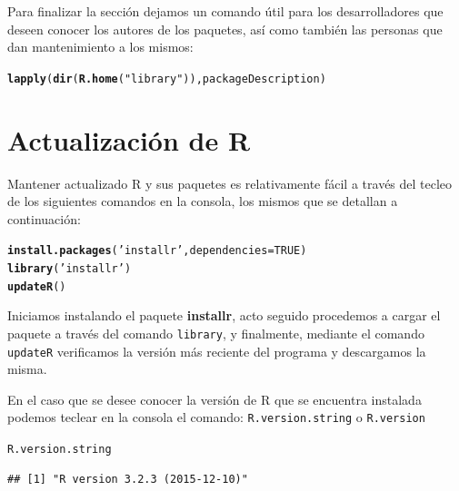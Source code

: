 \documentclass[11pt,a4paper,oneside]{book}\usepackage[]{graphicx}\usepackage[]{color}
\makeatletter
\newcommand{\hlnum}[1]{\textcolor[rgb]{0.686,0.059,0.569}{#1}}%
\newcommand{\hlstr}[1]{\textcolor[rgb]{0.192,0.494,0.8}{#1}}%
\newcommand{\hlstd}[1]{\textcolor[rgb]{0.345,0.345,0.345}{#1}}%
\newcommand{\hlkwc}[1]{\textcolor[rgb]{0.333,0.667,0.333}{#1}}%
\newcommand{\hlkwd}[1]{\textcolor[rgb]{0.737,0.353,0.396}{\textbf{#1}}}%
\newenvironment{kframe}{%
 \def\at@end@of@kframe{}%
 \ifinner\ifhmode%
  \def\at@end@of@kframe{\end{minipage}}%
  \begin{minipage}{\columnwidth}%
 \fi\fi%
 \def\FrameCommand##1{\hskip\@totalleftmargin \hskip-\fboxsep
 \colorbox{shadecolor}{##1}\hskip-\fboxsep
     \hskip-\linewidth \hskip-\@totalleftmargin \hskip\columnwidth}%
 \MakeFramed {\advance\hsize-\width
   \@totalleftmargin\z@ \linewidth\hsize
   \@setminipage}}%
 {\par\unskip\endMakeFramed%
 \at@end@of@kframe}
\newenvironment{knitrout}{}{} %
\makeatother
\begin{document}
\begin{itemize}
Para finalizar la sección dejamos un comando útil para los desarrolladores que deseen conocer los autores de los paquetes, así como también las personas que dan mantenimiento a los mismos:
\begin{knitrout}
\color{fgcolor}\begin{kframe}
\begin{alltt}
\hlkwd{lapply}\hlstd{(}\hlkwd{dir}\hlstd{(}\hlkwd{R.home}\hlstd{(}\hlstr{"library"}\hlstd{)), packageDescription)}
\end{alltt}
\end{kframe}
\end{knitrout}

\section{Actualización de R}

Mantener actualizado R y sus paquetes es relativamente fácil a través del tecleo de los siguientes comandos en la consola, los mismos que se detallan a continuación:
\begin{knitrout}
\color{fgcolor}\begin{kframe}
\begin{alltt}
\hlkwd{install.packages}\hlstd{(}\hlstr{'installr'}\hlstd{,} \hlkwc{dependencies} \hlstd{=} \hlnum{TRUE}\hlstd{)}
\hlkwd{library}\hlstd{(}\hlstr{'installr'}\hlstd{)}
\hlkwd{updateR}\hlstd{()}
\end{alltt}
\end{kframe}
\end{knitrout}

Iniciamos instalando el paquete \textbf{installr}, acto seguido procedemos a cargar el paquete a través del comando \texttt{library}, y finalmente, mediante el comando \texttt{updateR} verificamos la versión más reciente del programa  y descargamos la misma.\newline

En el caso que se desee conocer la versión de R que se encuentra instalada podemos teclear en la consola el comando: \texttt{R.version.string} o \texttt{R.version}
\begin{knitrout}
\color{fgcolor}\begin{kframe}
\begin{alltt}
\hlstd{R.version.string}
\end{alltt}
\begin{verbatim}
## [1] "R version 3.2.3 (2015-12-10)"
\end{verbatim}
\end{kframe}
\end{knitrout}


\end{itemize}
\end{document}
